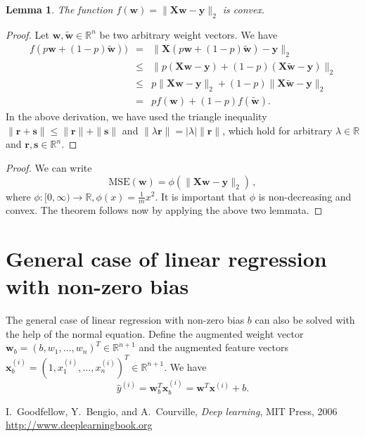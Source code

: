 \documentclass[12pt]{article}
\newtheorem{lem}{Lemma}
\newcommand{\R}{\mathbb{R}}
\newcommand{\x}{\boldsymbol{x}}
\newcommand{\X}{\boldsymbol{X}}
\newcommand{\y}{\boldsymbol{y}}
\newcommand{\w}{\boldsymbol{w}}
\newcommand{\mse}{\mathrm{MSE}}
\begin{document}
\begin{lem}
The function $f(\w)=\|\X\w - \y \|_2$ is convex.
\end{lem}
\begin{proof}
Let $\w, \tilde{\w}\in\R^n$ be two arbitrary weight vectors. We have
\begin{eqnarray*}
f(p \w + (1-p)\tilde{\w})) & = & \| \X (p \w + (1-p)\tilde{\w}) - \y \|_2 \\
& \le &
\| p (\X \w - \y) + (1-p)(\X \tilde{\w} - \y) \|_2 \\
& \le &
p \| \X \w - \y \|_2 + (1-p) \| \X \tilde{\w} - \y \|_2 \\
& = & p f(\w) + (1-p) f(\tilde{\w}).
\end{eqnarray*}
In the above derivation, we have used the triangle inequality $\| \boldsymbol{r} + \boldsymbol{s} \| \le \| \boldsymbol{r} \| + \| \boldsymbol{s}\|$ and $\| \lambda \boldsymbol{r} \| = |\lambda | \| \boldsymbol{r}\|$, which hold for arbitrary $\lambda\in \R$ and $\boldsymbol{r},\boldsymbol{s}\in\R^n$.
\end{proof}

\begin{proof}
We can write
\[
\mse(\w) = \phi( \| \X \w - \y \|_2 )\,,
\]
where $\phi : [0,\infty) \rightarrow \R, \phi(x)=\frac{1}{m} x^2$.  It is important that $\phi$ is non-decreasing and convex. The theorem follows now by applying the above two lemmata.
\end{proof}

\section{General case of linear regression with non-zero bias}

The general case of linear regression with non-zero bias $b$ can also be solved with the help of the normal equation. Define the augmented weight vector $\w_b = (b,w_1,\ldots,w_n)^T\in\R^{n+1}$ and the augmented feature vectors $\x^{(i)}_b=(1,x^{(i)}_1,\ldots,x^{(i)}_n)^T\in\R^{n+1}$.  We have
\[
\hat{y}^{(i)} = \w_b^T \x^{(i)}_b = \w^T \x^{(i)} + b.
\]

\begin{thebibliography}{}
I.~Goodfellow, Y.~Bengio, and A.~Courville, \emph{Deep learning}, MIT Press, 2006\\
\url{http://www.deeplearningbook.org}
\end{thebibliography}
\end{document}

